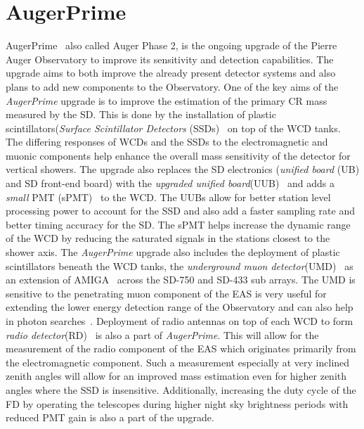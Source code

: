 \section{AugerPrime}
\label{sec:Aug_prime}
AugerPrime~\cite{ANASTASI2022167497} also called Auger Phase 2,  is the ongoing upgrade of the Pierre Auger Observatory to improve its sensitivity and detection capabilities. The upgrade aims to both improve the already present detector systems and also plans to add new components to the Observatory. One of the key aims of the \textit{AugerPrime} upgrade is to improve the estimation of the primary CR mass measured by the SD. This is done by the installation of plastic scintillators(\textit{Surface Scintillator Detectors} (SSDs)~\cite{Cataldi:2021uwd} on top of the WCD tanks. The differing responses of WCDs and the SSDs to the electromagnetic and muonic components help enhance the overall mass sensitivity of the detector for vertical showers. The upgrade also replaces the SD electronics (\textit{unified board} (UB) and SD front-end board) with the \textit{upgraded unified board}(UUB)~\cite{PierreAuger:2021nnx} and adds a \textit{small} PMT (sPMT)~\cite{PierreAuger:2023clx} to the WCD. The UUBs allow for better station level processing power to account for the SSD and also add a faster sampling rate and better timing accuracy for the SD. The sPMT helps increase the dynamic range of the WCD by reducing the saturated signals in the stations closest to the shower axis. The \textit{AugerPrime} upgrade also includes the deployment of plastic scintillators beneath the WCD tanks, the \textit{underground muon detector}(UMD)~\cite{AbdulHalim:2023ZF} as an extension of AMIGA~\cite{PierreAuger:2021fhj} across the SD-750 and SD-433 sub arrays. The UMD is sensitive to the penetrating muon component of the EAS is very useful for extending the lower energy detection range of the Observatory and can also help in photon searches~\cite{PierreAuger:2023nkh}. Deployment of radio antennas on top of each WCD to form \textit{radio detector}(RD)~\cite{Horandel:2023XL} is also a part of \textit{AugerPrime}. This will allow for the measurement of the radio component of the EAS which originates primarily from the electromagnetic component. Such a measurement especially at very inclined zenith angles will allow for an improved mass estimation even for higher zenith angles where the SSD is insensitive. Additionally, increasing the duty cycle of the FD by operating the telescopes during higher night sky brightness periods with reduced PMT gain is also a part of the upgrade. 

